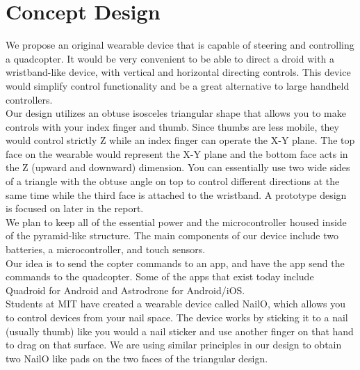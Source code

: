 \documentclass[12pt,letterpaper]{article}
\begin{document}
\section*{Concept Design}
\hspace{1cm}We propose an original wearable device that is capable of steering and controlling a quadcopter. It would be very convenient to be able to direct a droid with a wristband-like device, with vertical and horizontal directing controls. This device would simplify control functionality and be a great alternative to large handheld controllers.\\
\hspace{1cm}Our design utilizes an obtuse isosceles triangular shape that allows you to make controls with your index finger and thumb. Since thumbs are less mobile, they would control strictly Z while an index finger can operate the X-Y plane. The top face on the wearable would represent the X-Y plane and the bottom face acts in the Z (upward and downward) dimension. You can essentially use two wide sides of a triangle with the obtuse angle on top to control different directions at the same time while the third face is attached to the wristband. A prototype design is focused on later in the report.\\
\hspace{1cm}We plan to keep all of the essential power and the microcontroller housed inside of the pyramid-like structure. The main components of our device include two batteries, a microcontroller, and touch sensors.\\
\hspace{1cm}Our idea is to send the copter commands to an app, and have the app send the commands to the quadcopter. Some of the apps that exist today include Quadroid for Android and Astrodrone for Android/iOS. \\
\hspace{1cm}Students at MIT have created a wearable device called NailO, which allows you to control devices from your nail space. The device works by sticking it to a nail (usually thumb) like you would a nail sticker and use another finger on that hand to drag on that surface. We are using similar principles in our design to obtain two NailO like pads on the two faces of the triangular design. \\
\end{document}
